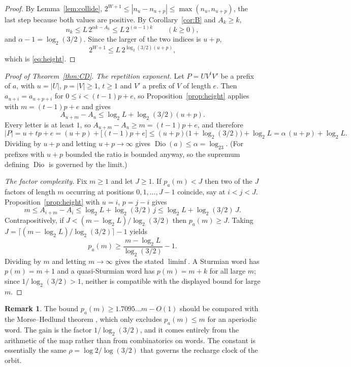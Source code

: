 \documentclass[11pt,reqno]{amsart}
\theoremstyle{plain}
\theoremstyle{definition}
\newtheorem{remark}[theorem]{Remark}
\numberwithin{equation}{section}
\begin{document}
\begin{proof}
By Lemma~\ref{lem:collide}, $2^{W+1}\le|n_u-n_{u+p}|\le\max(n_u,n_{u+p})$,
the last step because both values are positive.  By
Corollary~\ref{cor:B} and $A_k\ge k$,
\[
n_k\le L\,2^{\alpha k-A_k}\le L\,2^{(\alpha-1)k}
\qquad(k\ge0),
\]
and $\alpha-1=\log_2(3/2)$.  Since the larger of the two indices is $u+p$,
\[
2^{W+1}\le L\,2^{\log_2(3/2)(u+p)},
\]
which is \eqref{eq:height}.
\end{proof}

\begin{proof}[Proof of Theorem~\textup{\ref{thm:CD}}]
\emph{The repetition exponent.}  Let $P=UV^tV'$ be a prefix of $a$, with
$u=|U|$, $p=|V|\ge1$, $t\ge1$ and $V'$ a prefix of $V$ of length $e$.  Then
$a_{u+i}=a_{u+p+i}$ for $0\le i<(t-1)p+e$, so Proposition~\ref{prop:height}
applies with $m=(t-1)p+e$ and gives
\[
A_{u+m}-A_u\le\log_2L+\log_2(3/2)(u+p).
\]
Every letter is at least $1$, so $A_{u+m}-A_u\ge m=(t-1)p+e$, and therefore
\[
|P|=u+tp+e=(u+p)+\bigl[(t-1)p+e\bigr]
\le(u+p)\bigl(1+\log_2(3/2)\bigr)+\log_2L
=\alpha\,(u+p)+\log_2L .
\]
Dividing by $u+p$ and letting $u+p\to\infty$ gives
$\operatorname{Dio}(a)\le\alpha=\log_23$.  (For prefixes with $u+p$ bounded
the ratio is bounded anyway, so the supremum defining
$\operatorname{Dio}$ is governed by the limit.)

\emph{The factor complexity.}  Fix $m\ge1$ and let $J\ge1$.  If
$p_a(m)<J$ then two of the $J$ factors of length $m$ occurring at positions
$0,1,\dots,J-1$ coincide, say at $i<j<J$.  Proposition~\ref{prop:height}
with $u=i$, $p=j-i$ gives
\[
m\le A_{i+m}-A_i\le\log_2L+\log_2(3/2)\,j\le\log_2L+\log_2(3/2)\,J .
\]
Contrapositively, if $J<(m-\log_2L)/\log_2(3/2)$ then $p_a(m)\ge J$.  Taking
$J=\lceil(m-\log_2L)/\log_2(3/2)\rceil-1$ yields
\[
p_a(m)\ge\frac{m-\log_2L}{\log_2(3/2)}-1 .
\]
Dividing by $m$ and letting $m\to\infty$ gives the stated $\liminf$.  A
Sturmian word has $p(m)=m+1$ and a quasi-Sturmian word has $p(m)=m+k$ for
all large $m$; since $1/\log_2(3/2)>1$, neither is compatible with the
displayed bound for large $m$.
\end{proof}

\begin{remark}
The bound $p_a(m)\ge1.7095\ldots m-O(1)$ should be compared with the
Morse--Hedlund theorem \cite{morsehedlund1940}, which only excludes
$p_a(m)\le m$ for an aperiodic word.  The gain is the factor
$1/\log_2(3/2)$, and it comes entirely from the arithmetic of the map rather
than from combinatorics on words.  The constant is essentially the same
$\rho=\log2/\log(3/2)$ that governs the recharge clock of the orbit.
\end{remark}
\end{document}
